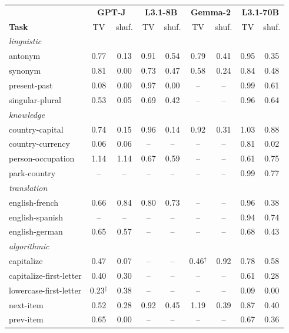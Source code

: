 \begin{tabular}{lcccccccc}
\toprule
 & \multicolumn{2}{c}{\textbf{GPT-J}} & \multicolumn{2}{c}{\textbf{L3.1-8B}} & \multicolumn{2}{c}{\textbf{Gemma-2}} & \multicolumn{2}{c}{\textbf{L3.1-70B}} \\
\textbf{Task} & TV & shuf. & TV & shuf. & TV & shuf. & TV & shuf. \\
\midrule
\multicolumn{9}{l}{\emph{linguistic}} \\
antonym & 0.77 & 0.13 & 0.91 & 0.54 & 0.79 & 0.41 & 0.95 & 0.35 \\
synonym & 0.81 & 0.00 & 0.73 & 0.47 & 0.58 & 0.24 & 0.84 & 0.48 \\
present-past & 0.08 & 0.00 & 0.97 & 0.00 & -- & -- & 0.99 & 0.61 \\
singular-plural & 0.53 & 0.05 & 0.69 & 0.42 & -- & -- & 0.96 & 0.64 \\
\multicolumn{9}{l}{\emph{knowledge}} \\
country-capital & 0.74 & 0.15 & 0.96 & 0.14 & 0.92 & 0.31 & 1.03 & 0.88 \\
country-currency & 0.06 & 0.06 & -- & -- & -- & -- & 0.81 & 0.02 \\
person-occupation & 1.14 & 1.14 & 0.67 & 0.59 & -- & -- & 0.61 & 0.75 \\
park-country & -- & -- & -- & -- & -- & -- & 0.99 & 0.77 \\
\multicolumn{9}{l}{\emph{translation}} \\
english-french & 0.66 & 0.84 & 0.80 & 0.73 & -- & -- & 0.96 & 0.38 \\
english-spanish & -- & -- & -- & -- & -- & -- & 0.94 & 0.74 \\
english-german & 0.65 & 0.57 & -- & -- & -- & -- & 0.68 & 0.43 \\
\multicolumn{9}{l}{\emph{algorithmic}} \\
capitalize & 0.47 & 0.07 & -- & -- & 0.46$^{\dagger}$ & 0.92 & 0.78 & 0.58 \\
capitalize-first-letter & 0.40 & 0.30 & -- & -- & -- & -- & 0.61 & 0.28 \\
lowercase-first-letter & 0.23$^{\dagger}$ & 0.38 & -- & -- & -- & -- & 0.09 & 0.00 \\
next-item & 0.52 & 0.28 & 0.92 & 0.45 & 1.19 & 0.39 & 0.87 & 0.40 \\
prev-item & 0.65 & 0.00 & -- & -- & -- & -- & 0.67 & 0.36 \\
\bottomrule
\end{tabular}
